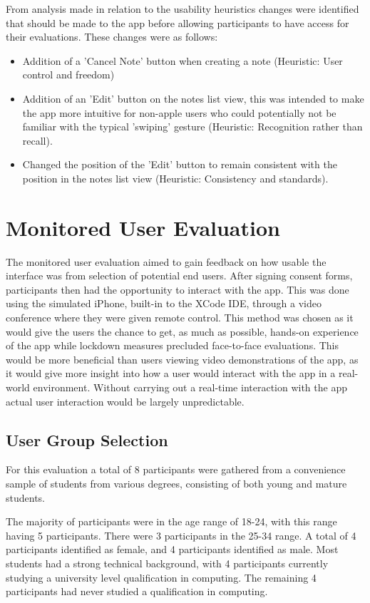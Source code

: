 \documentclass{l4proj}
\begin{document}
From analysis made in relation to the usability heuristics changes were identified that should be made to the app before allowing participants to have access for their evaluations. These changes were as follows:
\begin{itemize}
    \item Addition of a 'Cancel Note' button when creating a note (Heuristic: User control and freedom)
    \item Addition of an 'Edit' button on the notes list view, this was intended to make the app more intuitive for non-apple users who could potentially not be familiar with the typical 'swiping' gesture (Heuristic: Recognition rather than recall).
    \item Changed the position of the 'Edit' button to remain consistent with the position in the notes list view (Heuristic: Consistency and standards).
\end{itemize}


\section{Monitored User Evaluation}

The monitored user evaluation aimed to gain feedback on how usable the interface was from selection of potential end users. After signing consent forms, participants then had the opportunity to interact with the app. This was done using the simulated iPhone, built-in to the XCode IDE, through a video conference where they were given remote control. This method was chosen as it would give the users the chance to get, as much as possible, hands-on experience of the app while lockdown measures precluded face-to-face evaluations. This would be more beneficial than users viewing video demonstrations of the app, as it would give more insight into how a user would interact with the app in a real-world environment. Without carrying out a real-time interaction with the app actual user interaction would be largely unpredictable.

\subsection{User Group Selection}

For this evaluation a total of 8 participants were gathered from a convenience sample of students from various degrees, consisting of both young and mature students. 

The majority of participants were in the age range of 18-24, with this range having 5 participants. There were 3 participants in the 25-34 range. A total of 4 participants identified as female, and 4 participants identified as male. Most students had a strong technical background, with 4 participants currently studying a university level qualification in computing. The remaining 4 participants had never studied a qualification in computing.
\end{document}
